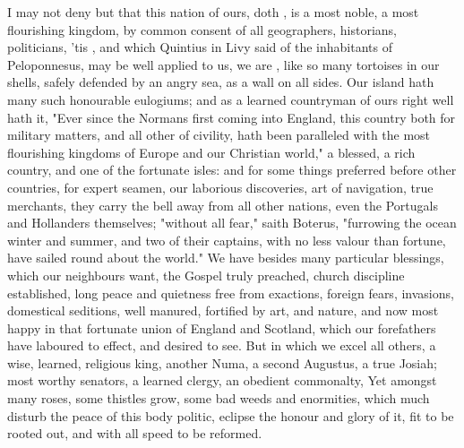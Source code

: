 I may not deny but that this nation of ours, doth , is a most noble, a most flourishing kingdom, by common consent of all
geographers, historians, politicians, 'tis , and which Quintius in Livy said of the inhabitants of
Peloponnesus, may be well applied to us, we are , like so many tortoises in our shells, safely defended by an angry
sea, as a wall on all sides. Our island hath many such honourable eulogiums;
and as a learned countryman of ours right well hath it,
"Ever since the Normans first coming into England, this
country both for military matters, and all other of civility, hath been
paralleled with the most flourishing kingdoms of Europe and our Christian
world," a blessed, a rich country, and one of the fortunate isles: and for some
things preferred before other countries, for expert seamen,
our laborious discoveries, art of navigation, true merchants, they carry the
bell away from all other nations, even the Portugals and Hollanders themselves;
"without all fear," saith Boterus, "furrowing the ocean
winter and summer, and two of their captains, with no less valour than fortune,
have sailed round about the world." We have besides many
particular blessings, which our neighbours want, the Gospel truly preached,
church discipline established, long peace and quietness free from exactions,
foreign fears, invasions, domestical seditions, well manured,
fortified by art, and nature, and now most happy in that
fortunate union of England and Scotland, which our forefathers have laboured to
effect, and desired to see. But in which we excel all others, a wise, learned,
religious king, another Numa, a second Augustus, a true Josiah; most worthy
senators, a learned clergy, an obedient commonalty, \etc{} Yet amongst many
roses, some thistles grow, some bad weeds and enormities, which much disturb
the peace of this body politic, eclipse the honour and glory of it, fit to be
rooted out, and with all speed to be reformed.

